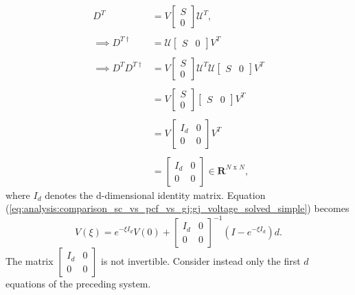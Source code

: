 \begin{enumerate}
\begin{align*}
	D^T
	&=
	V \begin{bmatrix} S \\ 0\end{bmatrix} \mathcal{U}^T,
	\\
	\\
	\implies
	D^{T \dagger}
	&= 
	\mathcal{U} \begin{bmatrix} S & 0\end{bmatrix} V^T
	\\
	\\
	\implies 
	D^T D^{T \dagger} 
	&=
	V \begin{bmatrix} S \\ 0\end{bmatrix} \mathcal{U}^T \mathcal{U} \begin{bmatrix} S & 0\end{bmatrix} V^T
	\\
	\\
	&=
	V \begin{bmatrix} S \\ 0\end{bmatrix} \begin{bmatrix} S & 0\end{bmatrix} V^T
	\\
	\\
	&= V \begin{bmatrix} I_{d} & 0 \\ 0 & 0 \end{bmatrix}  V^T
	\\
	\\
	&= \begin{bmatrix} I_{d} & 0 \\ 0 & 0 \end{bmatrix} \in \mathbf{R}^{N \text{ x } N},
\end{align*}
where $I_{d}$ denotes the d-dimensional identity matrix. Equation (\ref{eq:analysis:comparison_sc_vs_pcf_vs_gj:gj_voltage_solved_simple}) becomes
\\
$$
	V(\xi)
	=
	 e^{-\xi I_d } V(0)
	+
	\begin{bmatrix} I_{d} & 0 \\ 0 & 0 \end{bmatrix}^{-1}
	\left(
		I - e^{-\xi I_d}
	\right)
	d.
$$
The matrix $\begin{bmatrix} I_{d} & 0 \\ 0 & 0 \end{bmatrix}$ is not invertible. Consider instead only the first $d$ equations of the preceding system. 


\end{enumerate}
